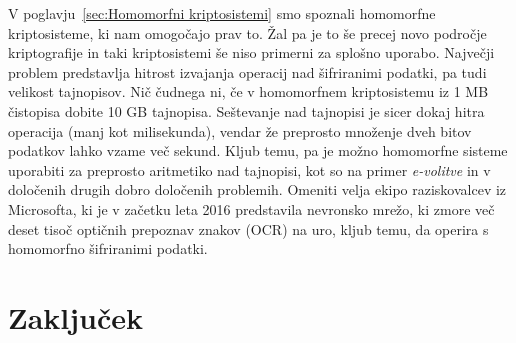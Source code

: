 \documentclass[12pt,a4paper,openany,tikz]{book}
\theoremstyle{plain}
\theoremstyle{definition}
\begin{document}
V poglavju~\ref{sec:Homomorfni kriptosistemi} smo spoznali homomorfne kriptosisteme, ki nam omogočajo prav to. Žal pa je to še precej novo področje kriptografije in taki kriptosistemi še niso primerni za splošno uporabo. Največji problem predstavlja hitrost izvajanja operacij nad šifriranimi podatki, pa tudi velikost tajnopisov. Nič čudnega ni, če v homomorfnem kriptosistemu iz 1 MB čistopisa dobite 10 GB tajnopisa. Seštevanje nad tajnopisi je sicer dokaj hitra operacija (manj kot milisekunda), vendar že preprosto množenje dveh bitov podatkov lahko vzame več sekund. Kljub temu, pa je možno homomorfne sisteme uporabiti za preprosto aritmetiko nad tajnopisi, kot so na primer \textit{e-volitve} in v določenih drugih dobro določenih problemih. Omeniti velja ekipo raziskovalcev iz Microsofta, ki je v začetku leta 2016 predstavila nevronsko mrežo, ki zmore več deset tisoč optičnih prepoznav znakov (OCR) na uro, kljub temu, da operira s homomorfno šifriranimi podatki.

\chapter{Zaključek}
\label{chap:Zakljucek}


\listoffigures

\clearpage

\listoftables




\clearpage
\nocite{*}

\label{literatura}

\end{document}
